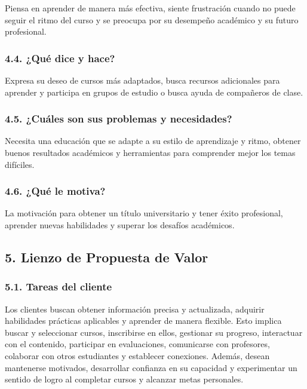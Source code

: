 \documentclass[
]{article}
\begin{document}
Piensa en aprender de manera más efectiva, siente frustración cuando no
puede seguir el ritmo del curso y se preocupa por su desempeño académico
y su futuro profesional.

\subsubsection{4.4. ¿Qué dice y hace?}\label{quuxe9-dice-y-hace}

Expresa su deseo de cursos más adaptados, busca recursos adicionales
para aprender y participa en grupos de estudio o busca ayuda de
compañeros de clase.

\subsubsection{4.5. ¿Cuáles son sus problemas y
necesidades?}\label{cuuxe1les-son-sus-problemas-y-necesidades}

Necesita una educación que se adapte a su estilo de aprendizaje y ritmo,
obtener buenos resultados académicos y herramientas para comprender
mejor los temas difíciles.

\subsubsection{4.6. ¿Qué le motiva?}\label{quuxe9-le-motiva}

La motivación para obtener un título universitario y tener éxito
profesional, aprender nuevas habilidades y superar los desafíos
académicos.

\newpage

\subsection{5. Lienzo de Propuesta de
Valor}\label{lienzo-de-propuesta-de-valor}

\subsubsection{5.1. Tareas del cliente}\label{tareas-del-cliente}

Los clientes buscan obtener información precisa y actualizada, adquirir
habilidades prácticas aplicables y aprender de manera flexible. Esto
implica buscar y seleccionar cursos, inscribirse en ellos, gestionar su
progreso, interactuar con el contenido, participar en evaluaciones,
comunicarse con profesores, colaborar con otros estudiantes y establecer
conexiones. Además, desean mantenerse motivados, desarrollar confianza
en su capacidad y experimentar un sentido de logro al completar cursos y
alcanzar metas personales.
\end{document}
